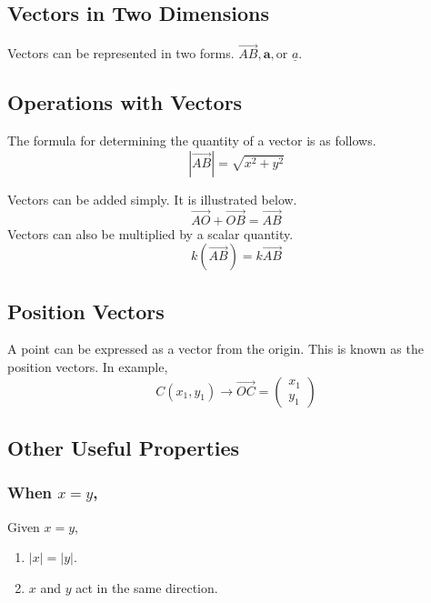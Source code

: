 \documentclass{report}
\begin{document}
\begin{flushleft}
\section{Vectors in Two Dimensions}
Vectors can be represented in two forms. $\overrightarrow{AB}, \textbf{a}, \text{or }\underline{a}.$

\subsection{Operations with Vectors}

The formula for determining the quantity of a vector is as follows.
\begin{equation}
| \overrightarrow{AB}| = \sqrt{x^2+y^2}
\end{equation}

Vectors can be added simply. It is illustrated below.
\begin{equation}
\overrightarrow{AO}+\overrightarrow{OB} = \overrightarrow{AB}
\end{equation}
Vectors can also be multiplied by a scalar quantity.
\begin{equation}
k \left(\overrightarrow{AB}\right) = k\overrightarrow{AB}
\end{equation}

\subsection{Position Vectors}
A point can be expressed as a vector from the origin. This is known as the position vectors. In example,
\begin{equation}
C\left(x_1,y_1\right) \rightarrow \overrightarrow{OC}= 
\begin{pmatrix}
x_1\\
y_1
\end{pmatrix}
\end{equation}

\subsection{Other Useful Properties}
\subsubsection{When $x=y$,}
Given $x=y$, 
\begin{enumerate}
\item $|x| = |y|$.
\item $x$ and $y$ act in the same direction.
\end{enumerate}


\end{flushleft}
\end{document}
